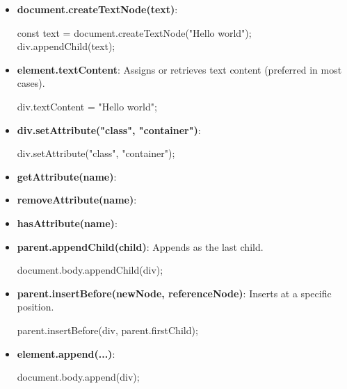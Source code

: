 \documentclass{report}
\begin{document}
\begin{itemize}
\begin{itemize}
\begin{jscode}
                    \end{jscode}
                \item \textbf{document.createTextNode(text)}:
                    \bigbreak \noindent 
                    \begin{jscode}
                        const text = document.createTextNode("Hello world");
                        div.appendChild(text);
                    \end{jscode}
                \item \textbf{element.textContent}: Assigns or retrieves text content (preferred in most cases).
                    \bigbreak \noindent 
                    \begin{jscode}
                    div.textContent = "Hello world";
                    \end{jscode}
                \item \textbf{div.setAttribute("class", "container")}:
                    \bigbreak \noindent 
                    \begin{jscode}
                    div.setAttribute("class", "container");
                    \end{jscode}
                \item \textbf{getAttribute(name)}:
                \item \textbf{removeAttribute(name)}:
                \item \textbf{hasAttribute(name)}: 
                \item \textbf{parent.appendChild(child)}: Appends as the last child.
                    \bigbreak \noindent 
                    \begin{jscode}
                    document.body.appendChild(div);
                    \end{jscode}
                \item \textbf{parent.insertBefore(newNode, referenceNode)}: Inserts at a specific position.
                    \bigbreak \noindent 
                    \begin{jscode}
                    parent.insertBefore(div, parent.firstChild);
                    \end{jscode}
                \item \textbf{element.append(...)}:
                    \bigbreak \noindent 
                    \begin{jscode}
                    document.body.append(div);
                    \end{jscode}

\end{itemize}
\end{itemize}
\end{document}
